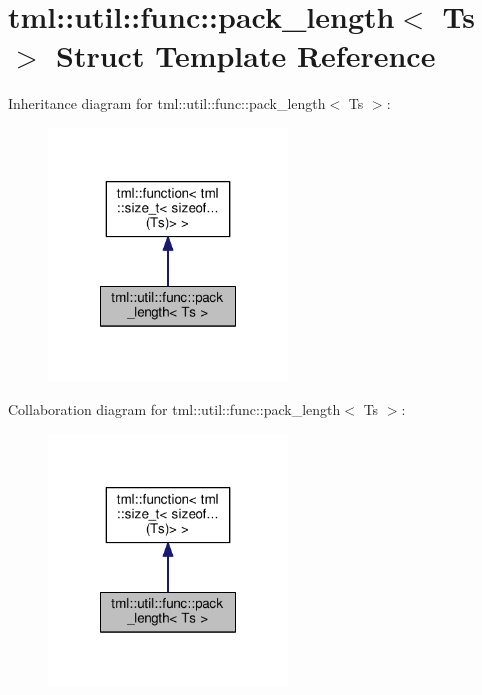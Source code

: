 \hypertarget{structtml_1_1util_1_1func_1_1pack__length}{\section{tml\+:\+:util\+:\+:func\+:\+:pack\+\_\+length$<$ Ts $>$ Struct Template Reference}
\label{structtml_1_1util_1_1func_1_1pack__length}
}


Inheritance diagram for tml\+:\+:util\+:\+:func\+:\+:pack\+\_\+length$<$ Ts $>$\+:
\nopagebreak
\begin{figure}[H]
\begin{center}
\leavevmode
\includegraphics[width=180pt]{structtml_1_1util_1_1func_1_1pack__length__inherit__graph}
\end{center}
\end{figure}


Collaboration diagram for tml\+:\+:util\+:\+:func\+:\+:pack\+\_\+length$<$ Ts $>$\+:
\nopagebreak
\begin{figure}[H]
\begin{center}
\leavevmode
\includegraphics[width=180pt]{structtml_1_1util_1_1func_1_1pack__length__coll__graph}
\end{center}
\end{figure}
